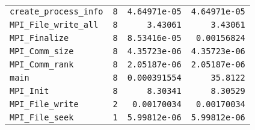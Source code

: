 \documentclass[a4paper,10pt]{article}
\begin{document}
\begin{center}
\begin{longtable}{|l||r|r|r|}
      \hline
  \verb|create_process_info| &   \verb|8| &   \verb|4.64971e-05| &   \verb|4.64971e-05| \\
  \verb|MPI_File_write_all| &   \verb|8| &   \verb|3.43061| &   \verb|3.43061| \\
  \verb|MPI_Finalize| &   \verb|8| &   \verb|8.53416e-05| &   \verb|0.00156824| \\
      \hline
  \verb|MPI_Comm_size| &   \verb|8| &   \verb|4.35723e-06| &   \verb|4.35723e-06| \\
  \verb|MPI_Comm_rank| &   \verb|8| &   \verb|2.05187e-06| &   \verb|2.05187e-06| \\
  \verb|main| &   \verb|8| &   \verb|0.000391554| &   \verb|35.8122| \\
      \hline
  \verb|MPI_Init| &   \verb|8| &   \verb|8.30341| &   \verb|8.30529| \\
  \verb|MPI_File_write| &   \verb|2| &   \verb|0.00170034| &   \verb|0.00170034| \\
  \verb|MPI_File_seek| &   \verb|1| &   \verb|5.99812e-06| &   \verb|5.99812e-06| \\
   \hline
\end{longtable}

\end{center}
\newpage

\newpage
\end{document}
